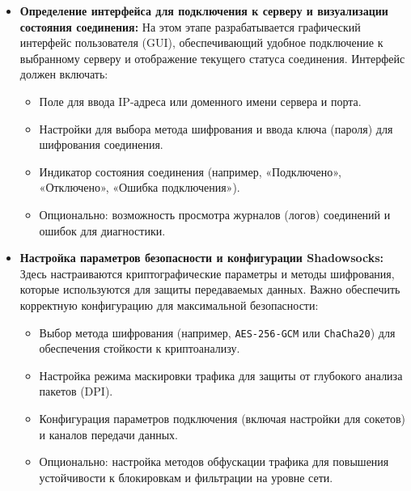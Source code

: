 \documentclass[a4paper,12pt]{article}
\begin{document}
\begin{itemize}
    \item \textbf{Определение интерфейса для подключения к серверу и визуализации состояния соединения:}  
    На этом этапе разрабатывается графический интерфейс пользователя (GUI), обеспечивающий удобное подключение к выбранному серверу и отображение текущего статуса соединения. Интерфейс должен включать:
    \begin{itemize}
        \item Поле для ввода IP-адреса или доменного имени сервера и порта.
        \item Настройки для выбора метода шифрования и ввода ключа (пароля) для шифрования соединения.
        \item Индикатор состояния соединения (например, «Подключено», «Отключено», «Ошибка подключения»).
        \item Опционально: возможность просмотра журналов (логов) соединений и ошибок для диагностики.
    \end{itemize}

    \item \textbf{Настройка параметров безопасности и конфигурации Shadowsocks:}  
    Здесь настраиваются криптографические параметры и методы шифрования, которые используются для защиты передаваемых данных. Важно обеспечить корректную конфигурацию для максимальной безопасности:
    \begin{itemize}
        \item Выбор метода шифрования (например, \texttt{AES-256-GCM} или \texttt{ChaCha20}) для обеспечения стойкости к криптоанализу.
        \item Настройка режима маскировки трафика для защиты от глубокого анализа пакетов (DPI).
        \item Конфигурация параметров подключения (включая настройки для сокетов) и каналов передачи данных.
        \item Опционально: настройка методов обфускации трафика для повышения устойчивости к блокировкам и фильтрации на уровне сети.
    \end{itemize}


\end{itemize}
\end{document}
